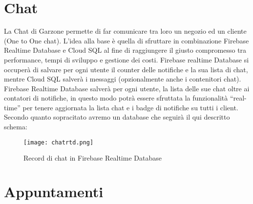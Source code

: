 \section{Chat}
La Chat di Garzone permette di far comunicare tra loro un negozio ed un  cliente (One to One chat). L’idea alla base è quella di sfruttare in combinazione Firebase Realtime Database e Cloud SQL al fine di raggiungere il giusto compromesso tra performance, tempi di sviluppo e gestione dei costi. Firebase realtime Database si occuperà di salvare per ogni utente il counter delle notifiche e la sua lista di chat, mentre Cloud SQL salverà i messaggi (opzionalmente anche i contenitori chat). Firebase Realtime Database salverà per ogni utente, la lista delle sue chat oltre ai contatori di notifiche, in questo modo potrà essere sfruttata la funzionalità “real-time” per tenere aggiornata la lista chat e i badge di notifiche su tutti i client.\\
Secondo quanto sopracitato avremo un database che seguirà il qui descritto schema:
\begin{figure}[h!]
    \centering
    \texttt{[image: chatrtd.png]}
    \caption{Record di chat in Firebase Realtime Database}
\end{figure}

\section{Appuntamenti}